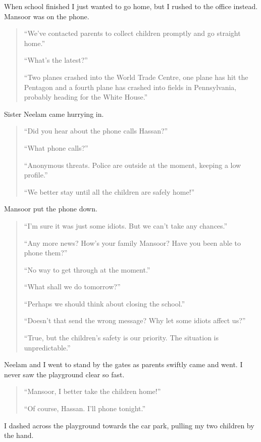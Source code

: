 \documentclass[12pt]{memoir}
\begin{document}
When school finished I just wanted to go home,
but I rushed to the office instead.
Mansoor was on the phone.

\begin{quote}
“We’ve contacted parents to collect children promptly and go straight home.”

“What’s the latest?”

“Two planes crashed into the World Trade Centre,
one plane has hit the Pentagon and a fourth plane has crashed
into fields in Pennsylvania, probably heading for the White House.”
\end{quote}

Sister Neelam came hurrying in.

\begin{quote}
“Did you hear about the phone calls Hassan?”

“What phone calls?”

“Anonymous threats.
Police are outside at the moment, keeping a low profile.”

“We better stay until all the children are safely home!”
\end{quote}

Mansoor put the phone down.

\begin{quote}
“I’m sure it was just some idiots.
But we can’t take any chances.”

“Any more news? How’s your family Mansoor? Have you been able to phone them?”

“No way to get through at the moment.”

“What shall we do tomorrow?”

“Perhaps we should think about closing the school.”

“Doesn’t that send the wrong message? Why let some idiots affect us?”

“True, but the children’s safety is our priority.
The situation is unpredictable.”
\end{quote}

Neelam and I went to stand by the gates as parents swiftly came and went.
I never saw the playground clear so fast.

\begin{quote}
“Mansoor, I better take the children home!”

“Of course, Hassan.
I’ll phone tonight.”
\end{quote}

I dashed across the playground towards the car park,
pulling my two children by the hand.
\end{document}
